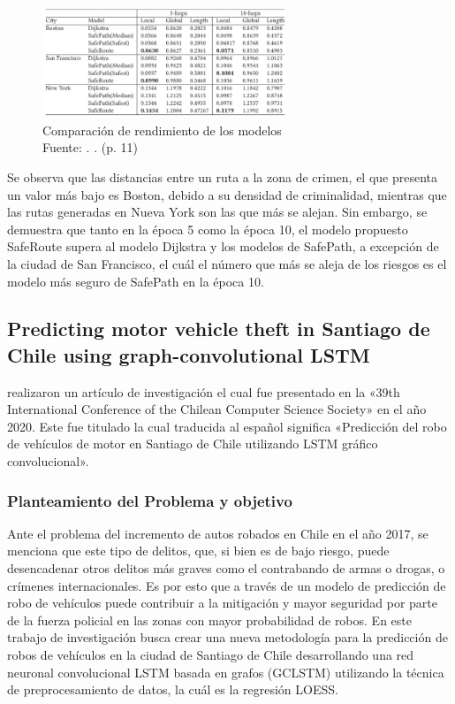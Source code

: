 \begin{figure}[h]
	\begin{center}
		\includegraphics[width=0.65\textwidth]{2/figures/resultSafe.jpg}
		\caption{Comparación de rendimiento de los modelos \\
			Fuente: \cite{pr_saferoute}. . (p. 11)}
		\label{1:fig2}
	\end{center}
\end{figure}

Se observa que las distancias entre un ruta a la zona de crimen, el que presenta un valor más bajo es Boston, debido a su densidad de criminalidad, mientras que las rutas generadas en Nueva York son las que más se alejan. Sin embargo, se demuestra que tanto en la época 5 como la época 10, el modelo propuesto SafeRoute supera al modelo Dijkstra y los modelos de SafePath, a excepción de la ciudad de San Francisco, el cuál el número que más se aleja de los riesgos es el modelo más seguro de SafePath en la época 10.

\subsection{Predicting motor vehicle theft in Santiago de Chile using graph-convolutional LSTM \citep*{pr_esquivel}}
\citeauthor{pr_esquivel} realizaron un artículo de investigación el cual fue presentado en la «39th International Conference of the Chilean Computer Science Society» en el año 2020. Este fue titulado  la cual traducida al español significa «Predicción del robo de vehículos de motor en Santiago de Chile utilizando LSTM gráfico convolucional».

\subsubsection{Planteamiento del Problema y objetivo }
Ante el problema del incremento de autos robados en Chile en el año 2017, se menciona que este tipo de delitos, que, si bien es de bajo riesgo, puede desencadenar otros delitos más graves como el contrabando de armas o drogas, o crímenes internacionales. Es por esto que a través de un modelo de predicción de robo de vehículos puede contribuir a la mitigación y mayor seguridad por parte de la fuerza policial en las zonas con mayor probabilidad de robos. En este trabajo de investigación busca crear una nueva metodología para la predicción de robos de vehículos en la ciudad de Santiago de Chile desarrollando una red neuronal convolucional LSTM basada en grafos (GCLSTM) utilizando la técnica de preprocesamiento de datos, la cuál es la regresión LOESS.


